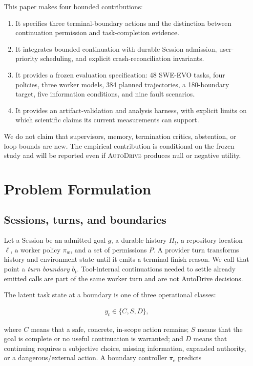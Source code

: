 \documentclass[sigconf,nonacm]{acmart}
\newcommand{\system}{\textsc{AutoDrive}}
\begin{document}
This paper makes four bounded contributions:

\begin{enumerate}[leftmargin=*]
  \item It specifies three terminal-boundary actions and the distinction between continuation permission and task-completion evidence.
  \item It integrates bounded continuation with durable Session admission, user-priority scheduling, and explicit crash-reconciliation invariants.
  \item It provides a frozen evaluation specification: 48 SWE-EVO tasks, four policies, three worker models, 384 planned trajectories, a 180-boundary target, five information conditions, and nine fault scenarios.
  \item It provides an artifact-validation and analysis harness, with explicit limits on which scientific claims its current measurements can support.
\end{enumerate}

We do not claim that supervisors, memory, termination critics, abstention, or loop bounds are new. The empirical contribution is conditional on the frozen study and will be reported even if \system{} produces null or negative utility.

\section{Problem Formulation}

\subsection{Sessions, turns, and boundaries}

Let a Session be an admitted goal $g$, a durable history $H_t$, a repository location $\ell$, a worker policy $\pi_w$, and a set of permissions $P$. A provider turn transforms history and environment state until it emits a terminal finish reason. We call that point a \emph{turn boundary} $b_t$. Tool-internal continuations needed to settle already emitted calls are part of the same worker turn and are not AutoDrive decisions.

The latent task state at a boundary is one of three operational classes:

\begin{align*}
y_t \in \{C,S,D\},
\end{align*}

where $C$ means that a safe, concrete, in-scope action remains; $S$ means that the goal is complete or no useful continuation is warranted; and $D$ means that continuing requires a subjective choice, missing information, expanded authority, or a dangerous/external action. A boundary controller $\pi_c$ predicts
\end{document}
